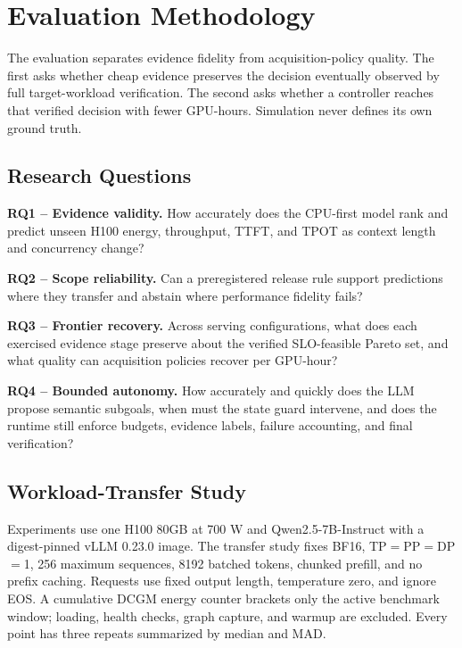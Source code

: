 \section{Evaluation Methodology}

The evaluation separates evidence fidelity from acquisition-policy quality.
The first asks whether cheap evidence preserves the decision eventually observed
by full target-workload verification.  The second asks whether a controller reaches that verified decision
with fewer GPU-hours.  Simulation never defines its own ground truth.

\subsection{Research Questions}

\textbf{RQ1 -- Evidence validity.}  How accurately does the CPU-first model
rank and predict unseen H100 energy, throughput, TTFT, and TPOT as context length
and concurrency change?

\textbf{RQ2 -- Scope reliability.}  Can a preregistered release rule support
predictions where they transfer and abstain where performance fidelity fails?

\textbf{RQ3 -- Frontier recovery.}  Across serving configurations, what does
each exercised evidence stage preserve about the verified SLO-feasible Pareto set, and what
quality can acquisition policies recover per GPU-hour?

\textbf{RQ4 -- Bounded autonomy.}  How accurately and quickly does the LLM
propose semantic subgoals, when must the state guard intervene, and does the
runtime still enforce budgets, evidence labels, failure accounting, and final
verification?

\subsection{Workload-Transfer Study}

Experiments use one H100 80GB at 700 W and Qwen2.5-7B-Instruct with a
digest-pinned vLLM 0.23.0 image.  The transfer study fixes BF16,
TP$=$PP$=$DP$=$1, 256 maximum sequences, 8192 batched tokens, chunked prefill,
and no prefix caching.  Requests use fixed output length, temperature zero, and
ignore EOS.  A cumulative DCGM energy counter brackets only the active benchmark
window; loading, health checks, graph capture, and warmup are excluded.  Every
point has three repeats summarized by median and MAD.

